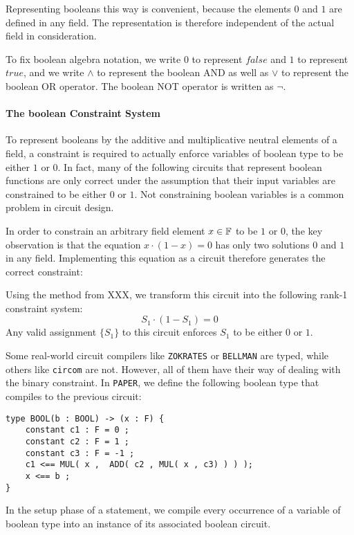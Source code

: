 Representing booleans this way is convenient, because the elements $0$ and $1$ are defined in any field. The representation is therefore independent of the actual field in consideration. 

To fix boolean algebra notation, we write $0$ to represent $false$ and $1$ to represent $true$, and we write $\wedge$ to represent the boolean AND as well as $\vee$ to represent the boolean OR operator. The boolean NOT operator is written as $\lnot$. 
\paragraph{The boolean Constraint System} To represent booleans by the additive and multiplicative neutral elements of a field, a constraint is required to actually enforce variables of boolean type to be either $1$ or $0$. In fact, many of the following circuits that represent boolean functions are only correct under the assumption that their input variables are constrained to be either $0$ or $1$. Not constraining boolean variables is a common problem in circuit design.

In order to constrain an arbitrary field element $x\in \mathbb{F}$ to be $1$ or $0$, the key observation is that the equation $x \cdot (1-x) =0$ has only two solutions $0$ and $1$ in any field. Implementing this equation as a circuit therefore generates the correct constraint:
\begin{center}
\end{center}
Using the method from XXX, we transform this circuit into the following rank-1 constraint system:
$$
S_1 \cdot (1-S_1) = 0
$$
Any valid assignment $\{S_1\}$ to this circuit enforces $S_1$ to be either $0$ or $1$. 

Some real-world circuit compilers like \texttt{ZOKRATES} or \texttt{BELLMAN} are typed, while others like \texttt{circom} are not. However, all of them have their way of dealing with the binary constraint. In \texttt{PAPER}, we define the following boolean type that compiles to the previous circuit:
\begin{lstlisting}
type BOOL(b : BOOL) -> (x : F) { 
	constant c1 : F = 0 ;
	constant c2 : F = 1 ;
	constant c3 : F = -1 ;
    c1 <== MUL( x ,  ADD( c2 , MUL( x , c3) ) ) );
    x <== b ;
}
\end{lstlisting}
In the setup phase of a statement, we compile every occurrence of a variable of boolean type into an instance of its associated boolean circuit.
